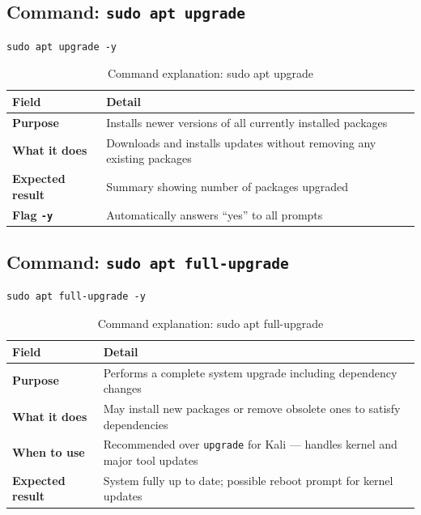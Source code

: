 \subsection{Command: \texttt{sudo apt upgrade}}

\begin{lstlisting}[style=terminal, caption={Upgrade installed packages}]
sudo apt upgrade -y
\end{lstlisting}

\begin{table}[H]
\centering
\caption{Command explanation: sudo apt upgrade}
\begin{tabularx}{\textwidth}{>{\bfseries}lX}
\toprule
Field & Detail \\
\midrule
Purpose & Installs newer versions of all currently installed packages \\
What it does & Downloads and installs updates without removing any existing packages \\
Expected result & Summary showing number of packages upgraded \\
Flag \texttt{-y} & Automatically answers ``yes'' to all prompts \\
\bottomrule
\end{tabularx}
\end{table}

\subsection{Command: \texttt{sudo apt full-upgrade}}

\begin{lstlisting}[style=terminal, caption={Full system upgrade}]
sudo apt full-upgrade -y
\end{lstlisting}

\begin{table}[H]
\centering
\caption{Command explanation: sudo apt full-upgrade}
\begin{tabularx}{\textwidth}{>{\bfseries}lX}
\toprule
Field & Detail \\
\midrule
Purpose & Performs a complete system upgrade including dependency changes \\
What it does & May install new packages or remove obsolete ones to satisfy dependencies \\
When to use & Recommended over \texttt{upgrade} for Kali — handles kernel and major tool updates \\
Expected result & System fully up to date; possible reboot prompt for kernel updates \\
\bottomrule
\end{tabularx}
\end{table}

